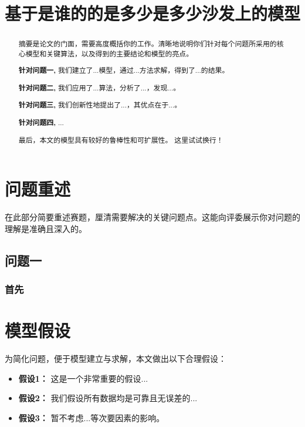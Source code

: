 \documentclass[withoutpreface,notoc]{cumcmthesis}
\title{基于是谁的的是多少是多少沙发上的模型} %
\begin{document}
	\maketitle
    \thispagestyle{plain}
	\begin{abstract}
		摘要是论文的门面，需要高度概括你的工作。清晰地说明你们针对每个问题所采用的核心模型和关键算法，以及得到的主要结论和模型的亮点。
		
		\textbf{针对问题一,} 我们建立了...模型，通过...方法求解，得到了...的结果。
		
		\textbf{针对问题二,} 我们应用了...算法，分析了...，发现...。
		
		\textbf{针对问题三,} 我们创新性地提出了...，其优点在于...。
		
		\textbf{针对问题四,} ...
		
		最后，本文的模型具有较好的鲁棒性和可扩展性。
        这里试试换行！
		
	\end{abstract}
	
	
	\section{问题重述}
	在此部分简要重述赛题，厘清需要解决的关键问题点。这能向评委展示你对问题的理解是准确且深入的。
    \subsection{问题一}
    \subsubsection{首先}
	
	\section{模型假设}
	为简化问题，便于模型建立与求解，本文做出以下合理假设：
	\begin{itemize}[itemindent=2em]
		\item \textbf{假设1：} 这是一个非常重要的假设...
		\item \textbf{假设2：} 我们假设所有数据均是可靠且无误差的...
		\item \textbf{假设3：} 暂不考虑...等次要因素的影响。
	\end{itemize}
	
\end{document}
